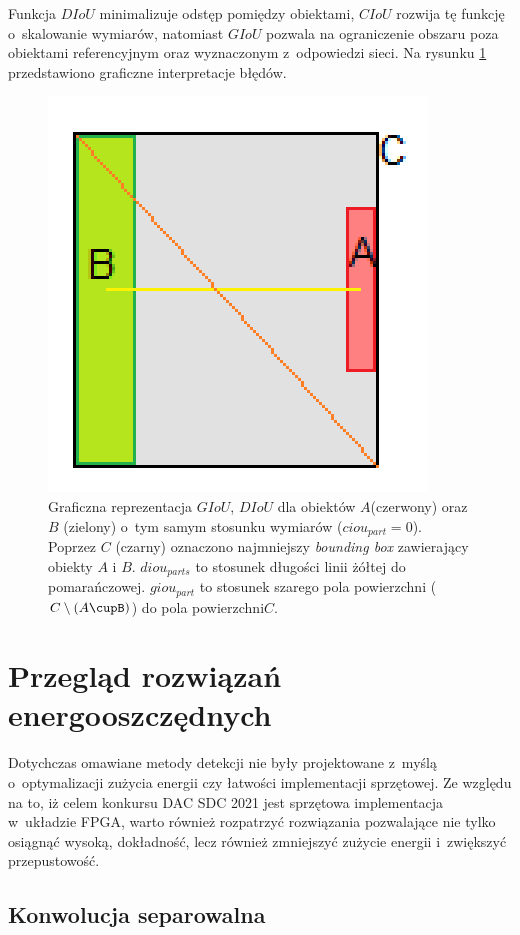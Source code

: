 Funkcja $DIoU$ minimalizuje odstęp pomiędzy obiektami, $CIoU$ rozwija tę funkcję o~skalowanie wymiarów, natomiast $GIoU$ pozwala na ograniczenie obszaru poza obiektami referencyjnym oraz wyznaczonym z~odpowiedzi sieci.
Na rysunku \ref{fig:iou_losses} przedstawiono graficzne interpretacje błędów.

\begin{figure}
    \centering
     \includegraphics[width=0.4\linewidth]{images/gcdiou.png}
    \caption{ Graficzna reprezentacja $GIoU$, $DIoU$ dla obiektów $A$(czerwony)  oraz $B$ (zielony) o~tym samym stosunku wymiarów ($ciou_{part} = 0$).
    Poprzez $C$ (czarny) oznaczono najmniejszy \emph{bounding box} zawierający obiekty $A$ i $B$.
    $diou_{parts}$ to stosunek długości linii żółtej do pomarańczowej. 
    $giou_{part}$ to stosunek szarego pola powierzchni ($C \setminus (A\cupB)$) do pola powierzchni$C$.}
    \label{fig:iou_losses}
\end{figure}

\section{Przegląd rozwiązań energooszczędnych}

Dotychczas omawiane metody detekcji nie były projektowane z~myślą o~optymalizacji zużycia energii czy łatwości implementacji sprzętowej. 
Ze względu na to, iż celem konkursu DAC SDC 2021 jest sprzętowa implementacja w~układzie FPGA, warto również rozpatrzyć rozwiązania pozwalające nie tylko osiągnąć wysoką, dokładność, lecz również zmniejszyć zużycie energii i~zwiększyć przepustowość.

\subsection{Konwolucja separowalna}
\label{subsec:sep_conv}


